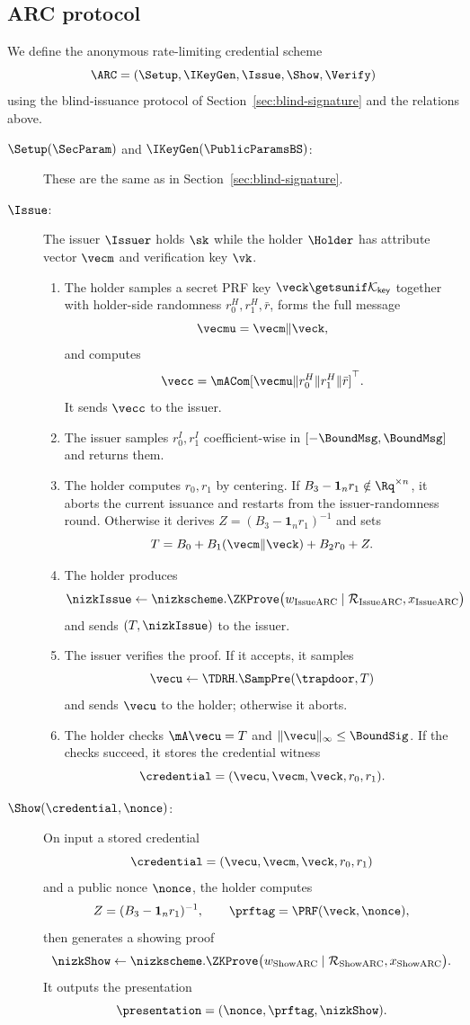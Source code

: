 \subsection{ARC protocol}
We define the anonymous rate-limiting credential scheme
\[
  \ARC=(\Setup,\IKeyGen,\Issue,\Show,\Verify)
\]
using the blind-issuance protocol of Section~\ref{sec:blind-signature} and the relations above.

\begin{description}
\item[$\Setup(\SecParam)$ and $\IKeyGen(\PublicParamsBS)$:] These are the same as in
Section~\ref{sec:blind-signature}.

\item[$\Issue$:] The issuer $\Issuer$ holds $\sk$ while the holder $\Holder$ has attribute vector $\vecm$ and
verification key $\vk$.
\begin{enumerate}[leftmargin=1.25em]
  \item The holder samples a secret PRF key $\veck\getsunif\mathcal K_{\mathsf{key}}$ together with holder-side randomness
  $r_0^H,r_1^H,\bar r$, forms the full message
  \[
    \vecmu=\vecm\Vert\veck,
  \]
  and computes
  \[
    \vecc=\mACom[\vecmu\Vert r_0^H\Vert r_1^H\Vert \bar r]^\top.
  \]
  It sends $\vecc$ to the issuer.
  \item The issuer samples $r_0^I,r_1^I$ coefficient-wise in $[-\BoundMsg,\BoundMsg]$ and returns them.
  \item The holder computes $r_0,r_1$ by centering.  If $B_3-\mathbf 1_n r_1\notin\Rq^{\times n}$, it aborts the current
  issuance and restarts from the issuer-randomness round.  Otherwise it derives $Z=(B_3-\mathbf 1_n r_1)^{-1}$ and sets
  \[
    T=B_0+B_1(\vecm\Vert\veck)+B_2r_0+Z.
  \]
  \item The holder produces
  \[
    \nizkIssue\gets \nizkscheme.\ZKProve
      \bigl(w_{\mathrm{IssueARC}}\mid \mathcal R_{\mathrm{IssueARC}},x_{\mathrm{IssueARC}}\bigr)
  \]
  and sends $(T,\nizkIssue)$ to the issuer.
  \item The issuer verifies the proof.  If it accepts, it samples
  \[
    \vecu\gets\TDRH.\SampPre(\trapdoor,T)
  \]
  and sends $\vecu$ to the holder; otherwise it aborts.
  \item The holder checks $\mA\vecu=T$ and $\|\vecu\|_\infty\le\BoundSig$.  If the checks succeed, it stores the
  credential witness
  \[
    \credential=(\vecu,\vecm,\veck,r_0,r_1).
  \]
\end{enumerate}

\item[$\Show(\credential,\nonce)$:] On input a stored credential
\[
  \credential=(\vecu,\vecm,\veck,r_0,r_1)
\]
and a public nonce $\nonce$, the holder computes
\[
  Z=(B_3-\mathbf 1_n r_1)^{-1},
  \qquad
  \prftag=\PRF(\veck,\nonce),
\]
then generates a showing proof
\[
  \nizkShow\gets \nizkscheme.\ZKProve
    \bigl(w_{\mathrm{ShowARC}}\mid \mathcal R_{\mathrm{ShowARC}},x_{\mathrm{ShowARC}}\bigr).
\]
It outputs the presentation
\[
  \presentation=(\nonce,\prftag,\nizkShow).
\]


\end{description}

